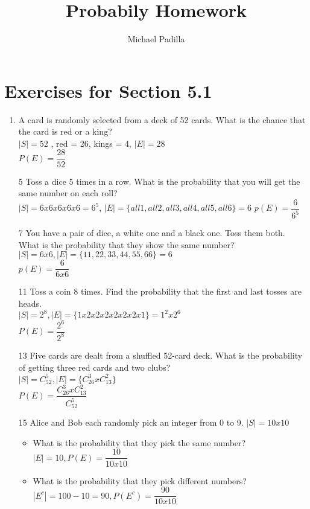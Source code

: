 \documentclass[12pt]{article}
\title{Probabily Homework}
\author{Michael Padilla}
\begin{document}
 
\maketitle
\section*{Exercises for Section 5.1}
\begin{enumerate}
    \item A card is randomly selected from a deck of 52 cards. What is the chance that the card is red or a king?\\
	$|S| = 52$ , red = 26, kings = 4, $|E| = 28$\\
	$P(E) = \dfrac{28}{52}$
    \item[5] Toss a dice 5 times in a row. What is the probability that you will get the same number on each roll?\\
	$|S| = 6x6x6x6x6 = 6^5$, $|E| = \{all1, all2, all3, all4, all5, all6\} = 6$
	$p(E) = \dfrac{6}{6^5}$
    \item[7] You have a pair of dice, a white one and a black one. Toss them both. What is the probability that they show the same number?\\
	$|S| = 6x6, |E| = \{11,22,33,44,55,66\} = 6$\\
	$p(E) = \dfrac{6}{6x6}$
    \item[11] Toss a coin 8 times. Find the probability that the first and last tosses are heads.\\
	$|S| = 2^8, |E| = \{1x2x2x2x2x2x2x1\} = 1^2x2^6$\\
	$P(E) = \dfrac{2^6}{2^8}$
    \item[13] Five cards are dealt from a shuffled 52-card deck. What is the probability of getting three red cards and two clubs?\\
	$|S| = C_{52}^5, |E| = \{C_{26}^3 x C_{13}^2\}$\\
	$P(E) = \dfrac{C_{26}^3 x C_{13}^2}{C_{52}^5}$
    \item[15] Alice and Bob each randomly pick an integer from 0 to 9.
	$|S| = 10x10$
	\begin{itemize}
	    \item What is the probability that they pick the same number?\\
		$|E| = 10, P(E) = \dfrac{10}{10x10}$
	    \item What is the probability that they pick different numbers?\\
		$|E^c| = 100-10=90, P(E^c) = \dfrac{90}{10x10}$
	\end{itemize}
\end{enumerate}
\end{document}
